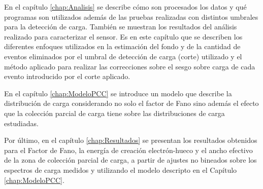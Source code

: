 En el capítulo \ref{chap:Analisis} se describe cómo son procesados los datos y qué programas son utilizados además de las pruebas realizadas con distintos umbrales para la detección de carga. También se muestran los resultados del análisis realizado para caracterizar el sensor. Es en este capítulo que se describen los diferentes enfoques utilizados en la estimación del fondo y de la cantidad de eventos eliminados por el umbral de detección de carga (corte) utilizado y el método aplicado para realizar las correcciones sobre el sesgo sobre carga de cada evento introducido por el corte aplicado.

En el capítulo \ref{chap:ModeloPCC} se introduce un modelo que describe la distribución de carga considerando no solo el factor de Fano sino además el efecto que la colección parcial de carga tiene sobre las distribuciones de carga estudiadas.

Por último, en el capítulo \ref{chap:Resultados} se presentan los resultados obtenidos para el Factor de Fano, la energía de creación electrón-hueco y el ancho efectivo de la zona de colección parcial de carga, a partir de ajustes no bineados sobre los espectros de carga medidos y utilizando el modelo descripto en el Capítulo \ref{chap:ModeloPCC}.

